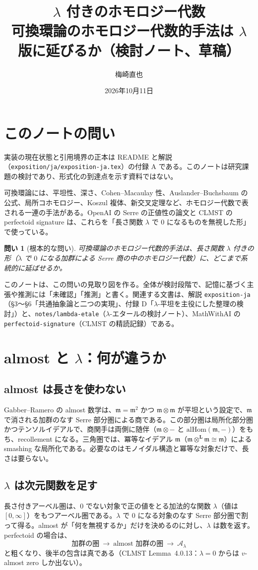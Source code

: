 \documentclass[11pt,a4paper]{ltjsarticle}
\title{$\lambda$ 付きのホモロジー代数\\[2pt]\large 可換環論のホモロジー代数的手法は $\lambda$ 版に延びるか（検討ノート、草稿）}
\author{梅崎直也}
\date{2026年10月11日}
\theoremstyle{plain}
\newtheorem{question}{問い}
\theoremstyle{definition}
\theoremstyle{remark}
\theoremstyle{plain}
\newcommand{\m}{\mathfrak{m}}
\begin{document}
\maketitle

\section*{このノートの問い}

実装の現在状態と引用境界の正本は README と解説（\texttt{exposition/ja/exposition-ja.tex}）の付録 A である。このノートは研究課題の検討であり、形式化の到達点を示す資料ではない。

可換環論には、平坦性、深さ、Cohen--Macaulay 性、Auslander--Buchsbaum の公式、局所コホモロジー、Koszul 複体、新交叉定理など、ホモロジー代数で表される一連の手法がある。OpenAI の Serre の正値性の論文と CLMST の perfectoid signature は、これらを「長さ関数 $\lambda$ で $0$ になるものを無視した形」で使っている。
\begin{question}[根本的な問い]
可換環論のホモロジー代数的手法は、長さ関数 $\lambda$ 付きの形（$\lambda$ で $0$ になる加群による Serre 商の中のホモロジー代数）に、どこまで系統的に延ばせるか。
\end{question}
このノートは、この問いの見取り図を作る。全体が検討段階で、記憶に基づく主張や推測には「未確認」「推測」と書く。関連する文書は、解説 \texttt{exposition-ja}（§3〜§6「共通抽象論と二つの実現」、付録 D「$\lambda$-平坦を主役にした整理の検討」）と、\texttt{notes/lambda-etale}（$\lambda$-エタールの検討ノート）、MathWithAI の \texttt{perfectoid-signature}（CLMST の精読記録）である。

\section{almost と $\lambda$：何が違うか}

\subsection{almost は長さを使わない}
Gabber--Ramero の almost 数学は、$\m = \m^2$ かつ $\m\otimes\m$ が平坦という設定で、$\m$ で消される加群のなす Serre 部分圏による商である。この部分圏は局所化部分圏かつテンソルイデアルで、商関手は両側に随伴（$\m\otimes-$ と $\mathrm{alHom}(\m,-)$）をもち、recollement になる。三角圏では、冪等なイデアル $\m$（$\m\otimes^{\mathbf{L}}\m\cong\m$）による smashing な局所化である。必要なのはモノイダル構造と冪等な対象だけで、長さは要らない。

\subsection{$\lambda$ は次元関数を足す}
長さ付きアーベル圏は、$0$ でない対象で正の値をとる加法的な関数 $\lambda$（値は $[0,\infty]$）をもつアーベル圏である。$\lambda$ で $0$ になる対象のなす Serre 部分圏で割って得る。almost が「何を無視するか」だけを決めるのに対し、$\lambda$ は数を返す。perfectoid の場合は、
\[
  \text{加群の圏}\ \to\ \text{almost 加群の圏}\ \to\ \mathscr{A}_\lambda
\]
と粗くなり、後半の包含は真である（CLMST Lemma~4.0.13：$\lambda = 0$ からは $v$-almost zero しか出ない）。
\end{document}
